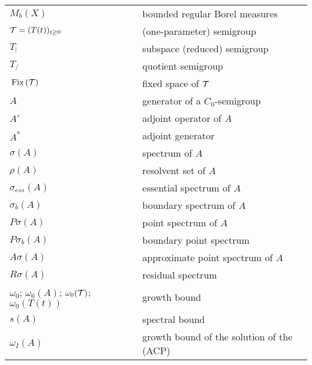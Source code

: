 \begin{longtable}{p{}p{}}
$M_{b}(X)$ & bounded regular Borel measures \\ %
$\mathcal{T} = (T(t))_{t \geq 0}$ & (one-parameter) semigroup \\ %
$T_{|}$ & subspace (reduced) semigroup \\ %
$T_{/}$ & quotient semigroup \\ %
$\mathop{}\mathrm{Fix}\left(\mathcal{T}\right)$ & fixed space of $\mathcal{T}$ \\ %
%
%
%
$A$ & generator of a $C_{0}$-semigroup\\ %
$A'$ & adjoint operator of $A$\\ %
$A^*$ & adjoint generator \\ %
$\sigma(A)$ & spectrum of $A$\\ %
$\rho(A)$ & resolvent set of $A$\\ %
$\sigma_{ess}(A)$ & essential spectrum of $A$\\ %
$\sigma_{b}(A)$ & boundary spectrum of $A$\\ %
$P{\sigma}(A)$ & point spectrum of $A$\\ %
$P{\sigma_b}(A)$ & boundary point spectrum \\ %
$A\sigma(A)$ & approximate point spectrum of $A$\\ %
$R{\sigma}(A)$ & residual spectrum \\ %
$\omega_{0}$; $\omega_{0}(A)$; $\omega_{0}(\mathcal{T})$; $\omega_{0}(T(t))$ & growth bound \\ %
$s(A)$ & spectral bound \\ %
$\omega_I(A)$ & growth bound of the solution of the (ACP) \\ %

\end{longtable}
